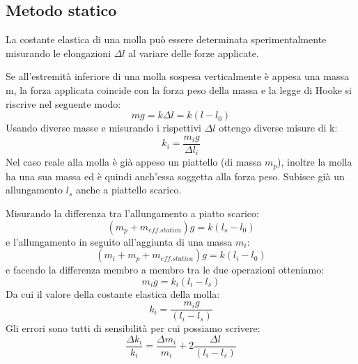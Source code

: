 \documentclass[a4paper,12pt]{article}
\begin{document}
\subsection{Metodo statico}
La costante elastica di una molla può essere determinata sperimentalmente misurando
le elongazioni $\Delta l$ al variare delle forze applicate.

Se all'estremità inferiore di una molla sospesa verticalmente è appesa una massa m,
la forza applicata coincide con la forza peso della massa e la legge di Hooke si riscrive
nel seguente modo:
$$
mg = k {\Delta l} = k (l-l_0)
$$
Usando diverse masse e misurando i rispettivi $\Delta l$ ottengo diverse misure di k:
$$
k_i = \frac{m_i g}{\Delta l_i}
$$
Nel caso reale alla molla è già appeso un piattello (di massa $m_p$),
inoltre la molla ha una sua massa ed è quindi anch'essa soggetta alla forza peso.
Subisce già un allungamento $l_s$ anche a piattello scarico.

Misurando la differenza tra l'allungamento a piatto scarico:
$$
(m_p + m_{eff.statica})g = k(l_s - l_0)
$$
e l'allungamento in seguito all'aggiunta di una massa $m_i$:
$$
(m_i + m_p + m_{eff.statica})g = k(l_i - l_0)
$$
e facendo la differenza membro a membro tra le due operazioni otteniamo:
$$
m_i g = k_i (l_i - l_s)
$$
Da cui il valore della costante elastica della molla:
$$
k_i = \frac{m_i g}{(l_i - l_s)}
$$
Gli errori sono tutti di sensibilità per cui possiamo scrivere:
$$
\frac{\Delta k_i}{k_i} = \frac{\Delta m_i}{m_i}+2\frac{\Delta l}{(l_i - l_s)}
$$
\end{document}
